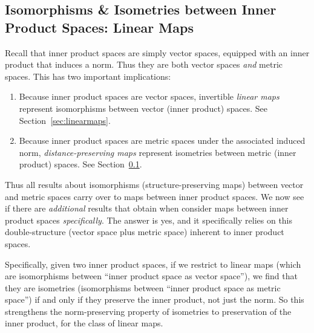 \documentclass[12pt]{book}
\numberwithin{equation}{section} %
\theoremstyle{plain}
\theoremstyle{definition}
\theoremstyle{remark}
\begin{document}
\clearpage
\subsection{%
  Isomorphisms \& Isometries between Inner Product Spaces: Linear Maps
}
\label{sec:isometries}


Recall that inner product spaces are simply vector spaces, equipped with
an inner product that induces a norm.
Thus they are both vector spaces \emph{and} metric spaces.
This has two important implications:
\begin{enumerate}[label=(\roman*)]
  \item Because inner product spaces are vector spaces, invertible
    \emph{linear maps} represent isomorphisms between vector (inner
    product) spaces.
    See Section~\ref{sec:linearmaps}.
  \item Because inner product spaces are metric spaces under the
    associated induced norm, \emph{distance-preserving maps} represent
    isometries between metric (inner product) spaces.
    See Section~\ref{sec:isometries}.
\end{enumerate}
Thus all results about isomorphisms (structure-preserving maps) between
vector and metric spaces carry over to maps between inner product
spaces.
We now see if there are \emph{additional} results that obtain when
consider maps between inner product spaces \emph{specifically}.
The answer is yes, and it specifically relies on this double-structure
(vector space plus metric space)
inherent to inner product spaces.


Specifically, given two inner product spaces, if we restrict to linear
maps (which are isomorphisms between ``inner product space as vector
space''), we find that they are isometries (isomorphisms between ``inner
product space as metric space'')
if and only if they preserve the inner product, not just the norm.
So this strengthens the norm-preserving property of isometries to
preservation of the inner product, for the class of linear maps.
\end{document}

